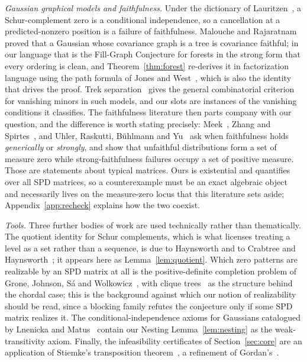 \documentclass[11pt]{article}
\theoremstyle{plain}
\theoremstyle{definition}
\theoremstyle{remark}
\begin{document}
\begin{humanblock}
\emph{Gaussian graphical models and faithfulness.} Under the dictionary of Lauritzen~\cite{Lauritzen},
a Schur-complement zero is a conditional independence, so a cancellation at a predicted-nonzero
position is a failure of faithfulness. Malouche and Rajaratnam~\cite{Malouche} proved that a Gaussian
whose covariance graph is a tree is covariance faithful; in our language that is the Fill-Graph
Conjecture for forests in the strong form that every ordering is clean, and
Theorem~\ref{thm:forest} re-derives it in factorization language using the path formula of Jones and
West~\cite{Jones}, which is also the identity that drives the proof. Trek
separation~\cite{Sullivant} gives the general combinatorial criterion for vanishing minors in such
models, and our slots are instances of the vanishing conditions it classifies. The faithfulness
literature then parts company with our question, and the difference is worth stating precisely:
Meek~\cite{Meek}, Zhang and Spirtes~\cite{Zhang}, and Uhler, Raskutti, B\"uhlmann and Yu~\cite{Uhler}
ask when faithfulness holds \emph{generically} or \emph{strongly}, and show that unfaithful
distributions form a set of measure zero while strong-faithfulness failures occupy a set of positive
measure. Those are statements about typical matrices. Ours is existential and quantifies over all SPD
matrices, so a counterexample must be an exact algebraic object and necessarily lives on the
measure-zero locus that this literature sets aside; Appendix~\ref{app:recheck} explains how the two
coexist.

\emph{Tools.} Three further bodies of work are used technically rather than thematically. The quotient
identity for Schur complements, which is what licenses treating a level as a set rather than a
sequence, is due to Haynsworth and to Crabtree and Haynsworth~\cite{Haynsworth,Crabtree}; it appears
here as Lemma~\ref{lem:quotient}. Which zero patterns are realizable by an SPD matrix at all is the
positive-definite completion problem of Grone, Johnson, S\'a and Wolkowicz~\cite{Grone}, with clique
trees~\cite{Blair} as the structure behind the chordal case; this is the background against which our
notion of realizability should be read, since a blocking family refutes the conjecture only if some
SPD matrix realizes it. The conditional-independence axioms for Gaussians catalogued by Lnenicka and
Matus~\cite{Lnenicka} contain our Nesting Lemma~\ref{lem:nesting} as the weak-transitivity axiom.
Finally, the infeasibility certificates of Section~\ref{sec:core} are an application of Stiemke's
transposition theorem~\cite{Stiemke}, a refinement of Gordan's~\cite{Gordan}.


\end{humanblock}
\end{document}
